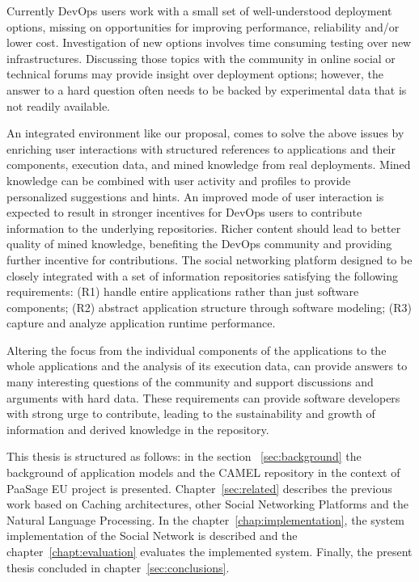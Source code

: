 Currently DevOps users work with a small set of
well-understood deployment options, missing on opportunities for improving performance, reliability and/or
lower cost. Investigation of new options involves time consuming testing over new infrastructures. Discussing those topics with the community in online social or technical forums may provide insight over deployment options;
however, the answer to a hard question often needs to be backed by experimental data that is not readily
available. 

An integrated environment like our proposal, comes to solve the above issues by enriching user interactions with structured references to applications and their components, execution data, and mined knowledge from real deployments. Mined knowledge can be combined with user activity and profiles to provide personalized suggestions and hints.  An improved mode of user interaction is expected to result in stronger incentives for DevOps users to contribute information to the underlying repositories. Richer content should lead to better quality of mined knowledge, benefiting the DevOps community and providing further incentive for contributions.  The social networking platform designed to be closely integrated with a set of information repositories satisfying the following requirements: 
(R1) handle entire applications rather than just software components; (R2) abstract application structure through software modeling; (R3) capture and analyze application runtime performance. 

Altering the focus from the individual components of the applications to the whole applications and the analysis of its execution data, can provide answers to many interesting questions of the community and support discussions and arguments with hard data. 
These requirements can provide software developers with strong urge to contribute, leading to the sustainability and growth of information and derived knowledge in the repository.

This thesis is structured as follows: in the section ~\ref{sec:background} the background of application models and the CAMEL repository in the context of PaaSage EU project is presented. Chapter~\ref{sec:related} describes the previous work based on Caching architectures, other Social Networking Platforms and the Natural Language Processing. In the chapter~\ref{chap:implementation}, the system implementation of the Social Network is described and the chapter~\ref{chapt:evaluation} evaluates the implemented system. Finally, the present thesis concluded in chapter~\ref{sec:conclusions}.

